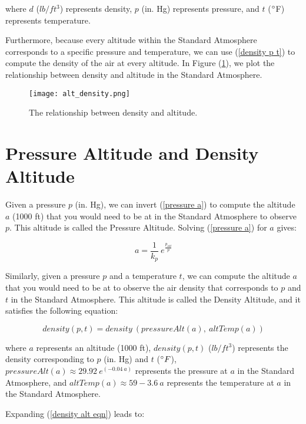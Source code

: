 \documentclass[10pt,a4paper]{article}
\begin{document}
where $d$ ($lb/ft^3$) represents density, $p$ (in. Hg) represents pressure, and $t$ ($\degree $F) represents temperature.

Furthermore, because every altitude within the Standard Atmosphere corresponds to a specific pressure and temperature, we can use (\ref{density p t}) to compute the density of the air at every altitude. In Figure (\ref{plot density}), we plot the relationship between density and altitude in the Standard Atmosphere.

\begin{figure}[H]
\texttt{[image: alt\_density.png]}
\caption{The relationship between density and altitude.}
\label{plot density}
\end{figure}

\section{Pressure Altitude and Density Altitude}

Given a pressure $p$ (in. Hg), we can invert (\ref{pressure a}) to compute the altitude $a$ (1000 ft) that you would need to be at in the Standard Atmosphere to observe $p$. This altitude is called the Pressure Altitude. Solving (\ref{pressure a}) for $a$ gives:

\begin{equation}
\label{alt p}
a = \frac{1}{k_{p}}\ e^{\frac{p_{std}}{p}}
\end{equation}

Similarly, given a pressure $p$ and a temperature $t$, we can compute the altitude $a$ that you would need to be at to observe the air density that corresponds to $p$ and $t$ in the Standard Atmosphere. This altitude is called the Density Altitude, and it satisfies the following equation:

\begin{equation}
\label{density alt eqn}
density (p, t) = density\ (pressureAlt (a),\ altTemp (a))
\end{equation}

where $a$ represents an altitude (1000 ft), $density (p, t)$ ($lb/ft^3$) represents the density corresponding to $p$ (in. Hg) and $t$ ($\degree F$), $pressureAlt (a) \approx 29.92\ e^{(- 0.04\ a)}$ represents the pressure at $a$ in the Standard Atmosphere, and $altTemp (a) \approx 59 - 3.6\ a$ represents the temperature at $a$ in the Standard Atmosphere.

Expanding (\ref{density alt eqn}) leads to:
\end{document}
